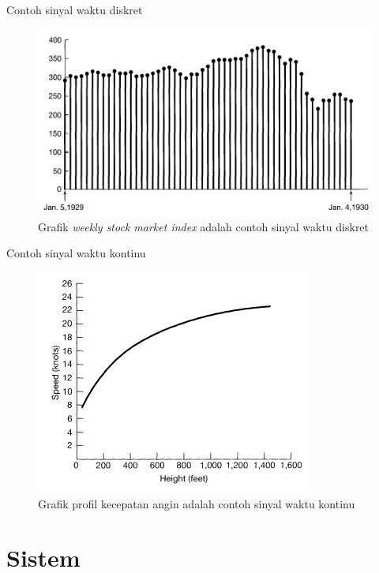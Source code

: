 \documentclass[pdflatex,compress,mathserif]{beamer}
\begin{document}
\begin{frame}{Contoh sinyal waktu diskret}
	\begin{figure}
		\includegraphics[height=0.7\textheight]{img/00.sinyal_waktu_diskret}
		\caption{Grafik \textit{weekly stock market index} adalah contoh sinyal waktu diskret}
	\end{figure}
\end{frame}

\begin{frame}{Contoh sinyal waktu kontinu}
	
	\begin{figure}
		\includegraphics[height=0.7\textheight]{img/00.sinyal_waktu_kontinu}
		\caption{Grafik profil kecepatan angin adalah contoh sinyal waktu kontinu}
	\end{figure}
\end{frame}


\section{Sistem}
\end{document}
